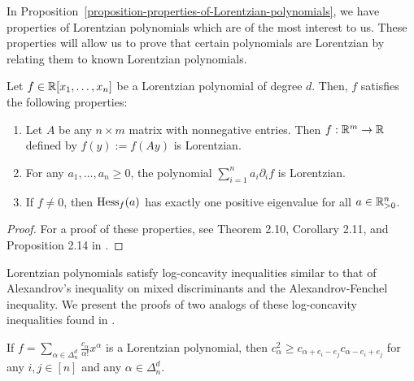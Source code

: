 \documentclass{puthesis-UG}
\begin{document}
In Proposition~\ref{proposition-properties-of-Lorentzian-polynomials}, we have properties of Lorentzian polynomials which are of the most interest to us. These properties will allow us to prove that certain polynomials are Lorentzian by relating them to known Lorentzian polynomials. 

\begin{prop} \label{proposition-properties-of-Lorentzian-polynomials}
	Let $f \in \mathbb{R}[x_1, \ldots, x_n]$ be a Lorentzian polynomial of degree $d$. Then, $f$ satisfies the following properties: 
	\begin{enumerate}[label = (\alph*)]
		\item Let $A$ be any $n \times m$ matrix with nonnegative entries. Then $f : \mathbb{R}^m \to \mathbb{R}$ defined by $f(y) := f(Ay)$ is Lorentzian. 

		\item For any $a_1, \ldots, a_n \geq 0$, the polynomial $\sum_{i = 1}^n a_i \partial_i f$ is Lorentzian. 

		\item If $f \neq 0$, then $\operatorname{Hess}_f(a)$ has exactly one positive eigenvalue for all $a \in \mathbb{R}_{> 0}^n$. 
	\end{enumerate}
\end{prop}
\begin{proof}
	For a proof of these properties, see Theorem 2.10, Corollary 2.11, and Proposition 2.14 in \cite{lorentzian-polynomials}. 
\end{proof}

Lorentzian polynomials satisfy log-concavity inequalities similar to that of Alexandrov's inequality on mixed discriminants and the Alexandrov-Fenchel inequality. We present the proofs of two analogs of these log-concavity inequalities found in \cite{lorentzian-polynomials}. 

\begin{prop} \label{proposition-log-concavity-property-of-lorentzian-polynomial}
	If $f = \sum_{\alpha \in \Delta_n^d} \frac{c_\alpha}{\alpha!} x^\alpha$ is a Lorentzian polynomial, then $c_\alpha^2 \geq c_{\alpha + e_i - e_j} c_{\alpha - e_i + e_j}$ for any $i, j \in [n]$ and any $\alpha \in \Delta_n^d$. 
\end{prop}
\end{document}
